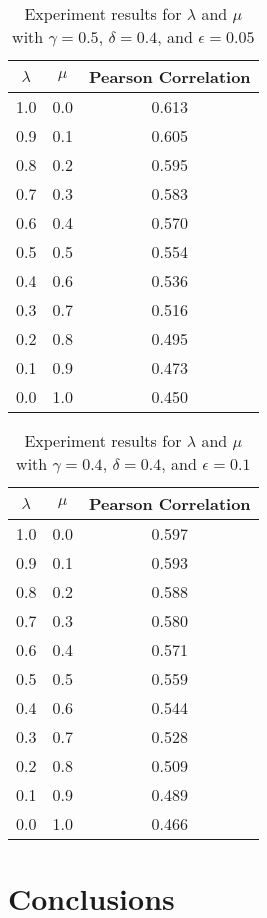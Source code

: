 \documentclass{article}
\begin{document}
\begin{table}[h!]
\centering
\begin{tabular}{|c|c||c|}
	\hline
	$\lambda$ & $\mu$ & Pearson Correlation \\
	\hline
	1.0 & 0.0 & 0.613 \\
	0.9 & 0.1 & 0.605 \\
	0.8 & 0.2 & 0.595 \\
	0.7 & 0.3 & 0.583 \\
	0.6 & 0.4 & 0.570 \\
	0.5 & 0.5 & 0.554 \\
	0.4 & 0.6 & 0.536 \\
	0.3 & 0.7 & 0.516 \\
	0.2 & 0.8 & 0.495 \\
	0.1 & 0.9 & 0.473 \\
	0.0 & 1.0 & 0.450 \\
	\hline
\end{tabular}
\caption{Experiment results for $\lambda$ and $\mu$ with $\gamma = 0.5$, $\delta = 0.4$, and $\epsilon = 0.05$}
\label{table:lambdamuresults1}
\end{table}

\begin{table}[h!]
\centering
\begin{tabular}{|c|c||c|}
	\hline
	$\lambda$ & $\mu$ & Pearson Correlation \\
	\hline
	1.0 & 0.0 & 0.597 \\
	0.9 & 0.1 & 0.593 \\
	0.8 & 0.2 & 0.588 \\
	0.7 & 0.3 & 0.580 \\
	0.6 & 0.4 & 0.571 \\
	0.5 & 0.5 & 0.559 \\
	0.4 & 0.6 & 0.544 \\
	0.3 & 0.7 & 0.528 \\
	0.2 & 0.8 & 0.509 \\
	0.1 & 0.9 & 0.489 \\
	0.0 & 1.0 & 0.466 \\
	\hline
\end{tabular}
\caption{Experiment results for $\lambda$ and $\mu$ with $\gamma = 0.4$, $\delta = 0.4$, and $\epsilon = 0.1$}
\label{table:lambdamuresults2}
\end{table}

\section{Conclusions} \label{sec:conclusions}
\end{document}
